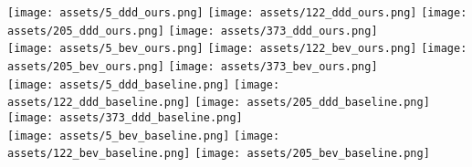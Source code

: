 \documentclass[10pt,twocolumn,letterpaper]{article}
\begin{document}
   
   \begin{figure*}[ht!]
           \texttt{[image: assets/5\_ddd\_ours.png]}
       \endminipage \hspace{1pt}
           \texttt{[image: assets/122\_ddd\_ours.png]}
       \endminipage \hspace{1pt}
           \texttt{[image: assets/205\_ddd\_ours.png]}
       \endminipage \hspace{1pt}
           \texttt{[image: assets/373\_ddd\_ours.png]}
       \endminipage\\
           \texttt{[image: assets/5\_bev\_ours.png]}
       \endminipage \hspace{1pt}
           \texttt{[image: assets/122\_bev\_ours.png]}
       \endminipage \hspace{1pt}
           \texttt{[image: assets/205\_bev\_ours.png]}
       \endminipage \hspace{1pt}
           \texttt{[image: assets/373\_bev\_ours.png]}
       \endminipage\\[3pt]
           \texttt{[image: assets/5\_ddd\_baseline.png]}
       \endminipage \hspace{1pt}
           \texttt{[image: assets/122\_ddd\_baseline.png]}
       \endminipage \hspace{1pt}
           \texttt{[image: assets/205\_ddd\_baseline.png]}
       \endminipage \hspace{1pt}
           \texttt{[image: assets/373\_ddd\_baseline.png]}
       \endminipage\\
           \texttt{[image: assets/5\_bev\_baseline.png]}
       \endminipage \hspace{1pt}
           \texttt{[image: assets/122\_bev\_baseline.png]}
       \endminipage \hspace{1pt}
           \texttt{[image: assets/205\_bev\_baseline.png]}

\end{figure*}
\end{document}
